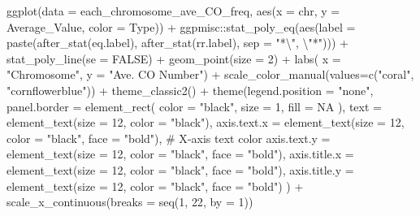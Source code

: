 \documentclass[
  letterpaper,
  DIV=11,
  numbers=noendperiod]{scrreprt}
\newenvironment{Shaded}{\begin{snugshade}}{\end{snugshade}}
\newcommand{\AttributeTok}[1]{\textcolor[rgb]{0.40,0.45,0.13}{#1}}
\newcommand{\CommentTok}[1]{\textcolor[rgb]{0.37,0.37,0.37}{#1}}
\newcommand{\ConstantTok}[1]{\textcolor[rgb]{0.56,0.35,0.01}{#1}}
\newcommand{\DecValTok}[1]{\textcolor[rgb]{0.68,0.00,0.00}{#1}}
\newcommand{\FunctionTok}[1]{\textcolor[rgb]{0.28,0.35,0.67}{#1}}
\newcommand{\NormalTok}[1]{\textcolor[rgb]{0.00,0.23,0.31}{#1}}
\newcommand{\SpecialCharTok}[1]{\textcolor[rgb]{0.37,0.37,0.37}{#1}}
\newcommand{\StringTok}[1]{\textcolor[rgb]{0.13,0.47,0.30}{#1}}
\begin{document}
\begin{codelisting}
\begin{Shaded}
\begin{Highlighting}[]
\FunctionTok{ggplot}\NormalTok{(}\AttributeTok{data =}\NormalTok{ each\_chromosome\_ave\_CO\_freq, }\FunctionTok{aes}\NormalTok{(}\AttributeTok{x =}\NormalTok{ chr, }\AttributeTok{y =}\NormalTok{ Average\_Value, }\AttributeTok{color =}\NormalTok{ Type)) }\SpecialCharTok{+}
\NormalTok{  ggpmisc}\SpecialCharTok{::}\FunctionTok{stat\_poly\_eq}\NormalTok{(}\FunctionTok{aes}\NormalTok{(}\AttributeTok{label =} \FunctionTok{paste}\NormalTok{(}\FunctionTok{after\_stat}\NormalTok{(eq.label),}
                               \FunctionTok{after\_stat}\NormalTok{(rr.label), }\AttributeTok{sep =} \StringTok{"*}\SpecialCharTok{\textbackslash{}"}\StringTok{, }\SpecialCharTok{\textbackslash{}"}\StringTok{*"}\NormalTok{))) }\SpecialCharTok{+}
  \FunctionTok{stat\_poly\_line}\NormalTok{(}\AttributeTok{se =} \ConstantTok{FALSE}\NormalTok{) }\SpecialCharTok{+}
  \FunctionTok{geom\_point}\NormalTok{(}\AttributeTok{size =} \DecValTok{2}\NormalTok{) }\SpecialCharTok{+} 
  \FunctionTok{labs}\NormalTok{(}
       \AttributeTok{x =} \StringTok{"Chromosome"}\NormalTok{,}
       \AttributeTok{y =} \StringTok{"Ave. CO Number"}\NormalTok{) }\SpecialCharTok{+}
  \FunctionTok{scale\_color\_manual}\NormalTok{(}\AttributeTok{values=}\FunctionTok{c}\NormalTok{(}\StringTok{"coral"}\NormalTok{, }\StringTok{"cornflowerblue"}\NormalTok{)) }\SpecialCharTok{+} \FunctionTok{theme\_classic2}\NormalTok{() }\SpecialCharTok{+}
  \FunctionTok{theme}\NormalTok{(}\AttributeTok{legend.position =} \StringTok{"none"}\NormalTok{,}
        \AttributeTok{panel.border =} \FunctionTok{element\_rect}\NormalTok{(}
          \AttributeTok{color =} \StringTok{"black"}\NormalTok{,}
          \AttributeTok{size =} \DecValTok{1}\NormalTok{,}
          \AttributeTok{fill =} \ConstantTok{NA}
\NormalTok{          ),}
        \AttributeTok{text =} \FunctionTok{element\_text}\NormalTok{(}\AttributeTok{size =} \DecValTok{12}\NormalTok{, }\AttributeTok{color =} \StringTok{"black"}\NormalTok{),}
        \AttributeTok{axis.text.x =} \FunctionTok{element\_text}\NormalTok{(}\AttributeTok{size =} \DecValTok{12}\NormalTok{, }\AttributeTok{color =} \StringTok{"black"}\NormalTok{, }\AttributeTok{face =} \StringTok{"bold"}\NormalTok{),  }\CommentTok{\# X{-}axis text color}
        \AttributeTok{axis.text.y =} \FunctionTok{element\_text}\NormalTok{(}\AttributeTok{size =} \DecValTok{12}\NormalTok{, }\AttributeTok{color =} \StringTok{"black"}\NormalTok{, }\AttributeTok{face =} \StringTok{"bold"}\NormalTok{),}
        \AttributeTok{axis.title.x =} \FunctionTok{element\_text}\NormalTok{(}\AttributeTok{size =} \DecValTok{12}\NormalTok{, }\AttributeTok{color =} \StringTok{"black"}\NormalTok{, }\AttributeTok{face =} \StringTok{"bold"}\NormalTok{),}
        \AttributeTok{axis.title.y =} \FunctionTok{element\_text}\NormalTok{(}\AttributeTok{size =} \DecValTok{12}\NormalTok{, }\AttributeTok{color =} \StringTok{"black"}\NormalTok{, }\AttributeTok{face =} \StringTok{"bold"}\NormalTok{)}
\NormalTok{        ) }\SpecialCharTok{+} \FunctionTok{scale\_x\_continuous}\NormalTok{(}\AttributeTok{breaks =} \FunctionTok{seq}\NormalTok{(}\DecValTok{1}\NormalTok{, }\DecValTok{22}\NormalTok{, }\AttributeTok{by =} \DecValTok{1}\NormalTok{))}


\end{Highlighting}
\end{Shaded}
\end{codelisting}
\end{document}
